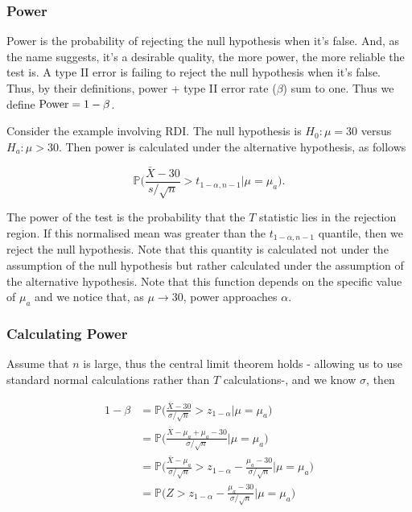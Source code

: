 \documentclass{homework}
\begin{document}
\clearpage

\subsubsection{Power}

Power is the probability of rejecting the null hypothesis when it's false. And, as the name suggests, it's a desirable quality, the more power, the more reliable the test is. A type II error is failing to reject the null hypothesis when it's false. Thus, by their definitions, power + type II error rate ($\beta$) sum to one. Thus we define $\textnormal{Power} = 1- \beta$.

Consider the example involving RDI. The null hypothesis is $H_0 : \mu = 30$ versus $H_a : \mu > 30$. Then power is calculated under the alternative hypothesis, as follows  

$$
\mathds{P}\bigg(\frac{\bar{X}-30}{s/\sqrt{n}} > t_{1-\alpha, n-1} \bigg | \mu = \mu_a\bigg).
$$

The power of the test is the probability that the $T$ statistic lies in the rejection region. If this normalised mean was greater than the $t_{1-\alpha, n-1}$ quantile, then we reject the null hypothesis. Note that this quantity is calculated not under the assumption of the null hypothesis but rather calculated under the assumption of the alternative hypothesis. Note that this function depends on the specific value of $\mu_a$ and we notice that, as $\mu \rightarrow 30$, power approaches $\alpha$. 

\subsubsection{Calculating Power}

Assume that $n$ is large, thus the central limit theorem holds - allowing us to use standard normal calculations rather than $T$ calculations-, and we know $\sigma$, then

\begin{align*}
        1- \beta &= \mathds{P}\bigg(\frac{\bar{X}-30}{\sigma/\sqrt{n}} > z_{1-\alpha}\bigg|\mu = \mu_a\bigg) \\
    &= \mathds{P}\bigg(\frac{\bar{X}-\mu_a+\mu_a-30}{\sigma/\sqrt{n}}\bigg| \mu = \mu_a\bigg) \\
    &= \mathds{P}\bigg(\frac{\bar{X}-\mu_a}{\sigma/\sqrt{n}}> z_{1-\alpha}-\frac{\mu_a-30}{\sigma/\sqrt{n}}\bigg|\mu = \mu_a\bigg) \\
    &= \mathds{P}\bigg(Z > z_{1-\alpha} -\frac{\mu_a-30}{\sigma/\sqrt{n}} \bigg|\mu = \mu_a\bigg)
\end{align*}
\end{document}
